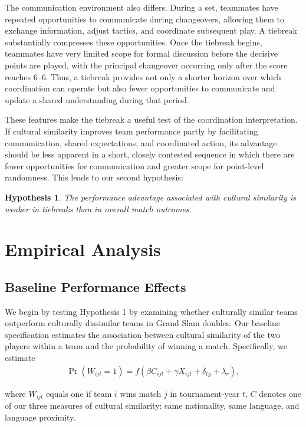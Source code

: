 \documentclass[10pt]{article}
\newtheorem{hypothesis}{Hypothesis}
\begin{document}
The communication environment also differs. During a set, teammates have repeated opportunities to communicate during changeovers, allowing them to exchange information, adjust tactics, and coordinate subsequent play. A tiebreak substantially compresses these opportunities. Once the tiebreak begins, teammates have very limited scope for formal discussion before the decisive points are played, with the principal changeover occurring only after the score reaches 6–6. Thus, a tiebreak provides not only a shorter horizon over which coordination can operate but also fewer opportunities to communicate and update a shared understanding during that period.

These features make the tiebreak a useful test of the coordination interpretation. If cultural similarity improves team performance partly by facilitating communication, shared expectations, and coordinated action, its advantage should be less apparent in a short, closely contested sequence in which there are fewer opportunities for communication and greater scope for point-level randomness. This leads to our second hypothesis:

\begin{hypothesis}
The performance advantage associated with cultural similarity is weaker in tiebreaks than in overall match outcomes.
\end{hypothesis}

\section{Empirical Analysis}

\subsection{Baseline Performance Effects}
We begin by testing Hypothesis 1 by examining whether culturally similar teams outperform culturally dissimilar teams in Grand Slam doubles. Our baseline specification estimates the association between cultural similarity of the two players within a team and the probability of winning a match. Specifically, we estimate
\begin{align}
  \operatorname{Pr}(W_{ijt} = 1) = f(\beta C_{ijt} + \gamma X_{ijt} + \delta_{ty} + \lambda_r) , 
\end{align}


where $W_{ijt}$ equals one if team $i$ wins match $j$ in tournament-year $t$, $C$ denotes one of our three measures of cultural similarity: same nationality, same language, and language proximity. %
\end{document}

